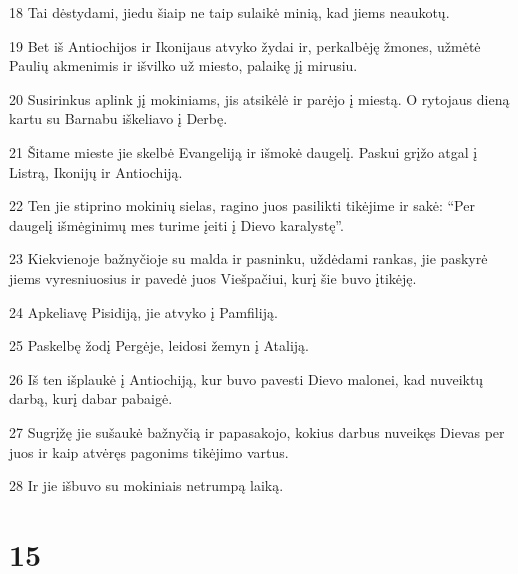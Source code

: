 \par 18 Tai dėstydami, jiedu šiaip ne taip sulaikė minią, kad jiems neaukotų. 
\par 19 Bet iš Antiochijos ir Ikonijaus atvyko žydai ir, perkalbėję žmones, užmėtė Paulių akmenimis ir išvilko už miesto, palaikę jį mirusiu. 
\par 20 Susirinkus aplink jį mokiniams, jis atsikėlė ir parėjo į miestą. O rytojaus dieną kartu su Barnabu iškeliavo į Derbę. 
\par 21 Šitame mieste jie skelbė Evangeliją ir išmokė daugelį. Paskui grįžo atgal į Listrą, Ikonijų ir Antiochiją. 
\par 22 Ten jie stiprino mokinių sielas, ragino juos pasilikti tikėjime ir sakė: “Per daugelį išmėginimų mes turime įeiti į Dievo karalystę”. 
\par 23 Kiekvienoje bažnyčioje su malda ir pasninku, uždėdami rankas, jie paskyrė jiems vyresniuosius ir pavedė juos Viešpačiui, kurį šie buvo įtikėję. 
\par 24 Apkeliavę Pisidiją, jie atvyko į Pamfiliją. 
\par 25 Paskelbę žodį Pergėje, leidosi žemyn į Ataliją. 
\par 26 Iš ten išplaukė į Antiochiją, kur buvo pavesti Dievo malonei, kad nuveiktų darbą, kurį dabar pabaigė. 
\par 27 Sugrįžę jie sušaukė bažnyčią ir papasakojo, kokius darbus nuveikęs Dievas per juos ir kaip atvėręs pagonims tikėjimo vartus. 
\par 28 Ir jie išbuvo su mokiniais netrumpą laiką.


\chapter{15}


